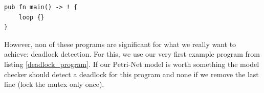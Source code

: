 \begin{lstlisting}
pub fn main() -> ! {
    loop {}
}
\end{lstlisting}
However, non of these programs are significant for what we really want to achieve: deadlock detection.
For this, we use our very first example program from listing \ref{deadlock_program}.
If our Petri-Net model is worth something the model checker should detect a deadlock for this program and none if we remove the last line (lock the mutex only once).